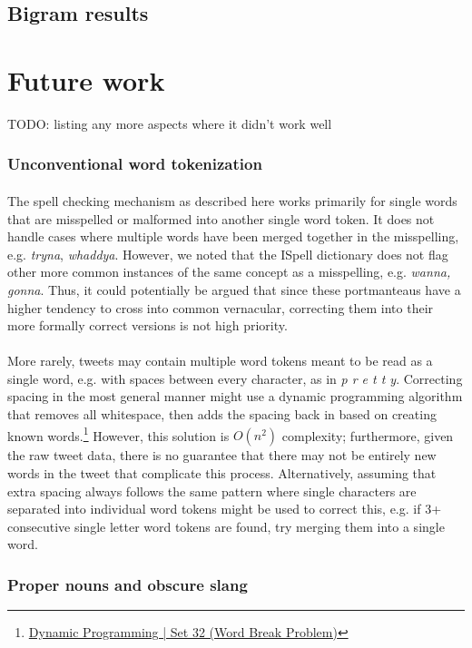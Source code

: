 \documentclass[twocolumn,10pt]{article}
\begin{document}
\subsection*{Bigram results}
\section*{Future work}
TODO: listing any more aspects where it didn't work well
\subsubsection*{Unconventional word tokenization}
\paragraph{} The spell checking mechanism as described here works primarily for single words that are misspelled or malformed into another single word token. It does not handle cases where multiple words have been merged together in the misspelling, e.g. \textit{tryna}, \textit{whaddya}. However, we noted that the ISpell dictionary does not flag other more common instances of the same concept as a misspelling, e.g. \textit{wanna, gonna}. Thus, it could potentially be argued that since these portmanteaus have a higher tendency to cross into common vernacular, correcting them into their more formally correct versions is not high priority.
\paragraph{} More rarely, tweets may contain multiple word tokens meant to be read as a single word, e.g. with spaces between every character, as in \textit{p r e t t y}. Correcting spacing in the most general manner might use a dynamic programming algorithm that removes all whitespace, then adds the spacing back in based on creating known words.\footnote{\href{http://www.geeksforgeeks.org/dynamic-programming-set-32-word-break-problem/}{Dynamic Programming | Set 32 (Word Break Problem)}} However, this solution is $O(n^2)$ complexity; furthermore, given the raw tweet data, there is no guarantee that there may not be entirely new words in the tweet that complicate this process. Alternatively, assuming that extra spacing always follows the same pattern where single characters are separated into individual word tokens might be used to correct this, e.g. if 3+ consecutive single letter word tokens are found, try merging them into a single word.
\subsubsection*{Proper nouns and obscure slang}
\end{document}
